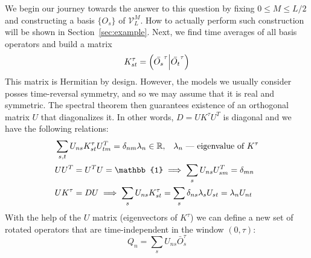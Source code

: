 We begin our journey towards the answer to this question by fixing \(0\leq M \leq L/2\) and constructing a basis \(\{O_s\}\) of \(\mathcal{V}_L^M\). How to actually perform such construction
will be shown in Section~\ref{sec:example}. Next, we find time averages of all basis operators and build a matrix
\begin{equation}
  K^{\tau}_{st} = \left(\bar{O_s}^{\tau} \middle| \bar{O_t}^{\tau}\right)
  \label{eq:stiffness matrix}
\end{equation}
This matrix is Hermitian by design. However, the models we usually
consider posses time-reversal symmetry, and so we may assume that it is real and symmetric.
The spectral theorem then guarantees existence of an orthogonal matrix \(U\) that
diagonalizes it. In other words, \(D = UK^{\tau}U^{T}\) is diagonal and we have the following relations:
\begin{align}
  &\sum_{s, t} U_{n s} K_{s t}^{\tau} U_{t m}^{T}=\delta_{nm} \lambda_{n} \in
   \RR,\;\;\; \lambda_n \text{ --- eigenvalue of }K^{\tau} \label{eq:property diag} \\
  &UU^{T} = U^{T}U = \mathbb{1} \implies \sum_{s} U_{ns}U_{sm}^{T} =
   \delta_{mn} \label{eq:propery ortho}\\
  & U K^{\tau} = D U \implies \sum_s U_{ns} K_{st}^{\tau} = \sum_s  \delta_{ns} \lambda_s U_{st} = \lambda_n U_{nt}\label{eq:property}
\end{align} 
With the help of the \(U\) matrix (eigenvectors of \(K^{\tau}\)) we can define a new set of rotated operators that
are time-independent in the window \(\left(0,\tau\right)\):
\begin{equation}
  Q_n = \sum_s U_{ns}\bar{O}_{s}^{\tau}\label{eq:new operators}
\end{equation} 

